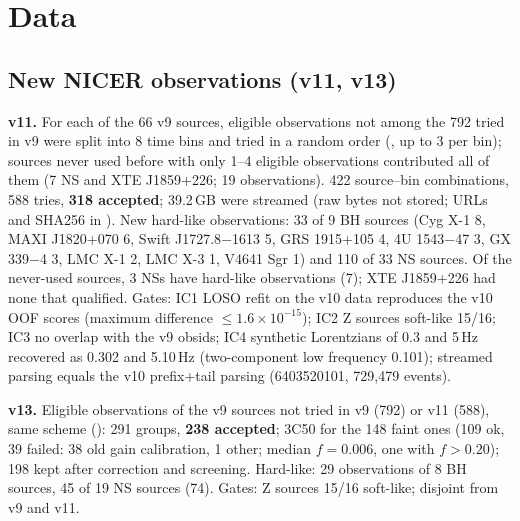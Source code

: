 \section{Data}
\subsection{New NICER observations (v11, v13)}
\textbf{v11.} For each of the 66 v9 sources, eligible observations not among the 792 tried in v9 were split into 8 time bins and tried in a
random order (, up to 3 per bin); sources never used before with only 1--4 eligible observations
contributed all of them (7 NS and XTE J1859+226; 19 observations). 422 source--bin combinations, 588 tries, \textbf{318 accepted}; 39.2\,GB
were streamed (raw bytes not stored; URLs and SHA256 in ). New hard-like observations: 33 of 9 BH sources (Cyg X-1 8,
MAXI J1820+070 6, Swift J1727.8$-$1613 5, GRS 1915+105 4, 4U 1543$-$47 3, GX 339$-$4 3, LMC X-1 2, LMC X-3 1, V4641 Sgr 1) and 110 of 33 NS sources.
Of the never-used sources, 3 NSs have hard-like observations (7); XTE J1859+226 had none that qualified. Gates: IC1 LOSO refit on the v10 data
reproduces the v10 OOF scores (maximum difference $\le1.6\times10^{-15}$); IC2 Z sources soft-like 15/16; IC3 no overlap with the v9 obsids; IC4
synthetic Lorentzians of 0.3 and 5\,Hz recovered as 0.302 and 5.10\,Hz (two-component low frequency 0.101); streamed parsing equals the v10
prefix+tail parsing (6403520101, 729,479 events).

\textbf{v13.} Eligible observations of the v9 sources not tried in v9 (792) or v11 (588), same scheme ():
291 groups, \textbf{238 accepted}; 3C50 for the 148 faint ones (109 ok, 39 failed: 38 old gain calibration, 1 other; median $f=0.006$, one
with $f>0.20$); 198 kept after correction and screening. Hard-like: 29 observations of 8 BH sources, 45 of 19 NS sources (74). Gates: Z sources
15/16 soft-like; disjoint from v9 and v11.

